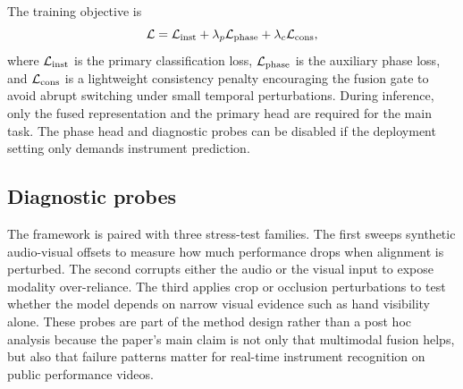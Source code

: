 The training objective is
\begin{equation}
\mathcal{L} = \mathcal{L}_{\mathrm{inst}} + \lambda_p \mathcal{L}_{\mathrm{phase}} + \lambda_c \mathcal{L}_{\mathrm{cons}},
\end{equation}
where $\mathcal{L}_{\mathrm{inst}}$ is the primary classification loss, $\mathcal{L}_{\mathrm{phase}}$ is the auxiliary phase loss, and $\mathcal{L}_{\mathrm{cons}}$ is a lightweight consistency penalty encouraging the fusion gate to avoid abrupt switching under small temporal perturbations. During inference, only the fused representation and the primary head are required for the main task. The phase head and diagnostic probes can be disabled if the deployment setting only demands instrument prediction.

\subsection{Diagnostic probes}

The framework is paired with three stress-test families. The first sweeps synthetic audio-visual offsets to measure how much performance drops when alignment is perturbed. The second corrupts either the audio or the visual input to expose modality over-reliance. The third applies crop or occlusion perturbations to test whether the model depends on narrow visual evidence such as hand visibility alone. These probes are part of the method design rather than a post hoc analysis because the paper's main claim is not only that multimodal fusion helps, but also that failure patterns matter for real-time instrument recognition on public performance videos.
